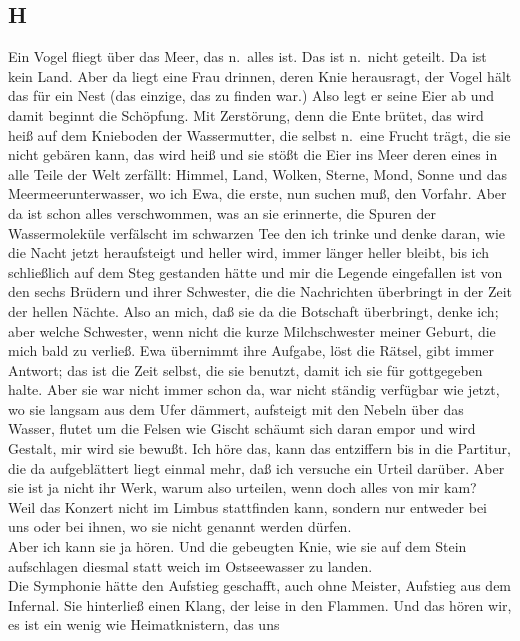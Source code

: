 \documentclass[
]{article}
\author{}
\date{\vspace{-2.5em}}
\begin{document}
\subsection{H}\label{h}

Ein Vogel fliegt über das Meer, das n.~alles ist. Das ist n.~nicht
geteilt. Da ist kein Land. Aber da liegt eine Frau drinnen, deren Knie
herausragt, der Vogel hält das für ein Nest (das einzige, das zu finden
war.) Also legt er seine Eier ab und damit beginnt die Schöpfung. Mit
Zerstörung, denn die Ente brütet, das wird heiß auf dem Knieboden der
Wassermutter, die selbst n.~eine Frucht trägt, die sie nicht gebären
kann, das wird heiß und sie stößt die Eier ins Meer deren eines in alle
Teile der Welt zerfällt: Himmel, Land, Wolken, Sterne, Mond, Sonne und
das Meermeerunterwasser, wo ich Ewa, die erste, nun suchen muß, den
Vorfahr. Aber da ist schon alles verschwommen, was an sie erinnerte, die
Spuren der Wassermoleküle verfälscht im schwarzen Tee den ich trinke und
denke daran, wie die Nacht jetzt heraufsteigt und heller wird, immer
länger heller bleibt, bis ich schließlich auf dem Steg gestanden hätte
und mir die Legende eingefallen ist von den sechs Brüdern und ihrer
Schwester, die die Nachrichten überbringt in der Zeit der hellen Nächte.
Also an mich, daß sie da die Botschaft überbringt, denke ich; aber
welche Schwester, wenn nicht die kurze Milchschwester meiner Geburt, die
mich bald zu verließ. Ewa übernimmt ihre Aufgabe, löst die Rätsel, gibt
immer Antwort; das ist die Zeit selbst, die sie benutzt, damit ich sie
für gottgegeben halte. Aber sie war nicht immer schon da, war nicht
ständig verfügbar wie jetzt, wo sie langsam aus dem Ufer dämmert,
aufsteigt mit den Nebeln über das Wasser, flutet um die Felsen wie
Gischt schäumt sich daran empor und wird Gestalt, mir wird sie bewußt.
Ich höre das, kann das entziffern bis in die Partitur, die da
aufgeblättert liegt einmal mehr, daß ich versuche ein Urteil darüber.
Aber sie ist ja nicht ihr Werk, warum also urteilen, wenn doch alles von
mir kam?\\
Weil das Konzert nicht im Limbus stattfinden kann, sondern nur entweder
bei uns oder bei ihnen, wo sie nicht genannt werden dürfen.\\
Aber ich kann sie ja hören. Und die gebeugten Knie, wie sie auf dem
Stein aufschlagen diesmal statt weich im Ostseewasser zu landen.\\
Die Symphonie hätte den Aufstieg geschafft, auch ohne Meister, Aufstieg
aus dem Infernal. Sie hinterließ einen Klang, der leise in den Flammen.
Und das hören wir, es ist ein wenig wie Heimatknistern, das uns
\end{document}
